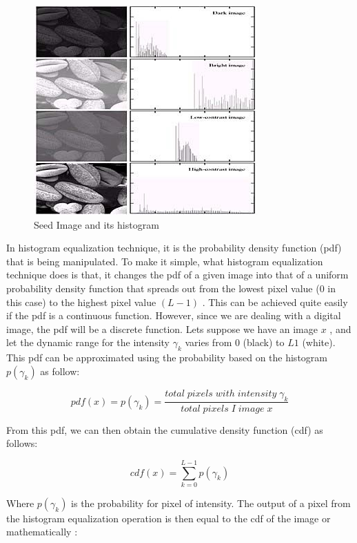 \begin{figure}
	\centering
	\includegraphics[scale=1]{images/ch3/histogramEqualization.jpg}
	\caption{Seed Image and its histogram}
	\label{fig:histogramEqualization}
\end{figure}

In histogram equalization technique, it is the probability density function (pdf)
that is being manipulated. To make it simple, what histogram equalization technique
does is that, it changes the pdf of a given image into that of a uniform probability
density function that spreads out from the lowest pixel value ($0$ in this case) to
the highest pixel value $(L − 1)$ . This can be achieved quite easily if the pdf is a
continuous function. However, since we are dealing with a digital image, the pdf
will be a discrete function. Lets suppose we have an image $x$ , and let the dynamic
range for the intensity $\gamma_{k}$ varies from $0$ (black) to $L1$ (white). This pdf can be
approximated using the probability based on the histogram $p(\gamma_{k})$ as follow:

\begin{equation}
	pdf(x)=p(\gamma_{k})= \frac{total\;pixels\;with\;intensity\; \gamma_{k}}{total\;pixels\;I\;image\;x}
\end{equation}

From this pdf, we can then obtain the cumulative density function (cdf) as follows:

\begin{equation}
	cdf(x)=\sum_{k=0}^{L-1}p(\gamma_{k})
\end{equation}

Where $p(\gamma_{k})$ is the probability for pixel of intensity. The output of a pixel from
the histogram equalization operation is then equal to the cdf of the image or mathematically :

